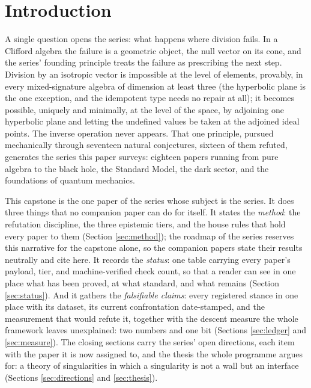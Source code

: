\documentclass[11pt]{article}
\theoremstyle{definition}
\begin{document}
\newpage
\section{Introduction}\label{sec:intro}

A single question opens the series: what happens where division fails. In a Clifford algebra the failure is a geometric object, the null vector on its cone, and the series' founding principle treats the failure as prescribing the next step. Division by an isotropic vector is impossible at the level of elements, provably, in every mixed-signature algebra of dimension at least three (the hyperbolic plane is the one exception, and the idempotent type needs no repair at all); it becomes possible, uniquely and minimally, at the level of the space, by adjoining one hyperbolic plane and letting the undefined values be taken at the adjoined ideal points. The inverse operation never appears. That one principle, pursued mechanically through seventeen natural conjectures, sixteen of them refuted, generates the series this paper surveys: eighteen papers running from pure algebra to the black hole, the Standard Model, the dark sector, and the foundations of quantum mechanics.

This capstone is the one paper of the series whose subject is the series. It does three things that no companion paper can do for itself. It states the \emph{method}: the refutation discipline, the three epistemic tiers, and the house rules that hold every paper to them (Section \ref{sec:method}); the roadmap of the series reserves this narrative for the capstone alone, so the companion papers state their results neutrally and cite here. It records the \emph{status}: one table carrying every paper's payload, tier, and machine-verified check count, so that a reader can see in one place what has been proved, at what standard, and what remains (Section \ref{sec:status}). And it gathers the \emph{falsifiable claims}: every registered stance in one place with its dataset, its current confrontation date-stamped, and the measurement that would refute it, together with the descent measure the whole framework leaves unexplained: two numbers and one bit (Sections \ref{sec:ledger} and \ref{sec:measure}). The closing sections carry the series' open directions, each item with the paper it is now assigned to, and the thesis the whole programme argues for: a theory of singularities in which a singularity is not a wall but an interface (Sections \ref{sec:directions} and \ref{sec:thesis}).
\end{document}
